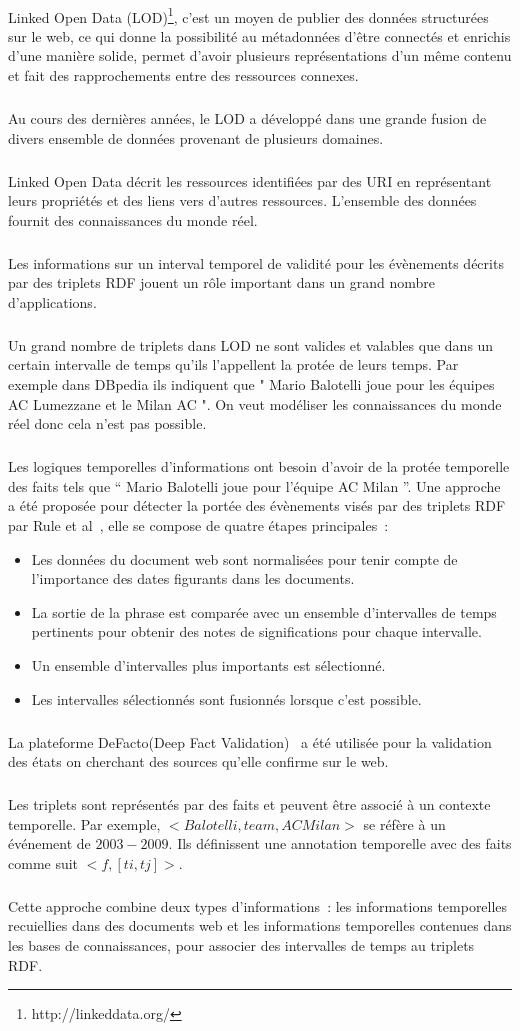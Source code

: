\paragraph{}
Linked Open Data (LOD)\footnote{http://linkeddata.org/}, c'est un moyen de publier des données structurées sur le web, ce qui donne la possibilité au métadonnées d'être connectés et enrichis d'une manière solide, permet d'avoir plusieurs représentations d'un même contenu et fait des rapprochements entre des ressources connexes. 
\subparagraph{}
Au cours des dernières années, le LOD a développé dans une grande fusion de divers ensemble de données provenant de plusieurs domaines.
\subparagraph{}
Linked Open Data décrit les ressources identifiées par des URI en représentant leurs propriétés et des liens vers d’autres ressources.
L'ensemble des données fournit des connaissances du monde réel.
\subparagraph{}
Les informations sur un interval temporel de validité pour les évènements décrits par des triplets RDF jouent un rôle important dans un grand nombre d'applications.
\subparagraph{}
Un grand nombre de triplets dans LOD ne sont valides et valables que dans un certain intervalle de temps qu'ils l'appellent la protée de leurs temps.
Par exemple dans DBpedia ils indiquent que " Mario Balotelli joue pour les équipes AC Lumezzane et le Milan AC ". On veut modéliser les connaissances du monde réel donc cela n'est pas possible.
\subparagraph{}
Les logiques temporelles d'informations ont besoin d'avoir de la protée temporelle des faits tels que “ Mario Balotelli joue pour l'équipe AC Milan ”.
Une approche a été proposée pour détecter la portée des évènements visés par des triplets RDF par Rule et al~\cite{rula2013}, elle se compose de quatre étapes principales~:
\begin{itemize}
\item Les données du document web sont normalisées pour tenir compte de l’importance des dates figurants dans les documents.
\item La sortie de la phrase est comparée avec un ensemble d’intervalles de temps pertinents pour obtenir des notes de significations pour chaque intervalle.
\item Un ensemble d’intervalles plus importants est sélectionné.
\item Les intervalles sélectionnés sont fusionnés lorsque c’est possible.
\end{itemize}
\subparagraph{}
La plateforme DeFacto(Deep Fact Validation)~\cite{lehmann2012} a été utilisée pour la validation des états on cherchant des sources qu'elle confirme sur le web.
\subparagraph{}
Les triplets sont représentés par des faits et peuvent être associé à un contexte temporelle.
Par exemple, $<Balotelli, team, AC Milan>$ se réfère à un événement de $2003-2009$. 
Ils définissent une annotation temporelle avec des faits comme suit $<f, [ti,tj]>$.
\subparagraph{}
Cette approche combine deux types d'informations~: les informations temporelles recuiellies dans des documents web et les informations temporelles contenues dans les bases de connaissances, pour associer des intervalles de temps au triplets RDF.
